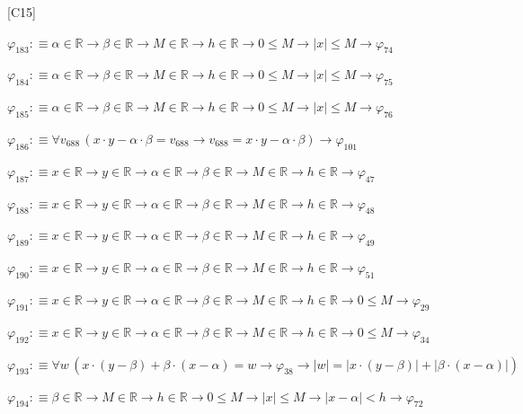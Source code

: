 \begin{fullproof}{[C15]}
\begin{abbrevlist}
\item $\varphi_{183} :\equiv \alpha \in \mathbb{R} \to \beta \in \mathbb{R} \to M \in \mathbb{R} \to h \in \mathbb{R} \to 0 \leq M \to \lvert x \rvert \leq M \to \varphi_{74}$
\item $\varphi_{184} :\equiv \alpha \in \mathbb{R} \to \beta \in \mathbb{R} \to M \in \mathbb{R} \to h \in \mathbb{R} \to 0 \leq M \to \lvert x \rvert \leq M \to \varphi_{75}$
\item $\varphi_{185} :\equiv \alpha \in \mathbb{R} \to \beta \in \mathbb{R} \to M \in \mathbb{R} \to h \in \mathbb{R} \to 0 \leq M \to \lvert x \rvert \leq M \to \varphi_{76}$
\item $\varphi_{186} :\equiv \forall v_{688}\,(x \cdot y - \alpha \cdot \beta = v_{688} \to v_{688} = x \cdot y - \alpha \cdot \beta) \to \varphi_{101}$
\item $\varphi_{187} :\equiv x \in \mathbb{R} \to y \in \mathbb{R} \to \alpha \in \mathbb{R} \to \beta \in \mathbb{R} \to M \in \mathbb{R} \to h \in \mathbb{R} \to \varphi_{47}$
\item $\varphi_{188} :\equiv x \in \mathbb{R} \to y \in \mathbb{R} \to \alpha \in \mathbb{R} \to \beta \in \mathbb{R} \to M \in \mathbb{R} \to h \in \mathbb{R} \to \varphi_{48}$
\item $\varphi_{189} :\equiv x \in \mathbb{R} \to y \in \mathbb{R} \to \alpha \in \mathbb{R} \to \beta \in \mathbb{R} \to M \in \mathbb{R} \to h \in \mathbb{R} \to \varphi_{49}$
\item $\varphi_{190} :\equiv x \in \mathbb{R} \to y \in \mathbb{R} \to \alpha \in \mathbb{R} \to \beta \in \mathbb{R} \to M \in \mathbb{R} \to h \in \mathbb{R} \to \varphi_{51}$
\item $\varphi_{191} :\equiv x \in \mathbb{R} \to y \in \mathbb{R} \to \alpha \in \mathbb{R} \to \beta \in \mathbb{R} \to M \in \mathbb{R} \to h \in \mathbb{R} \to 0 \leq M \to \varphi_{29}$
\item $\varphi_{192} :\equiv x \in \mathbb{R} \to y \in \mathbb{R} \to \alpha \in \mathbb{R} \to \beta \in \mathbb{R} \to M \in \mathbb{R} \to h \in \mathbb{R} \to 0 \leq M \to \varphi_{34}$
\item $\varphi_{193} :\equiv \forall w\,(x \cdot (y - \beta) + \beta \cdot (x - \alpha) = w \to \varphi_{38} \to \lvert w \rvert = \lvert x \cdot (y - \beta) \rvert + \lvert \beta \cdot (x - \alpha) \rvert)$
\item $\varphi_{194} :\equiv \beta \in \mathbb{R} \to M \in \mathbb{R} \to h \in \mathbb{R} \to 0 \leq M \to \lvert x \rvert \leq M \to \lvert x - \alpha \rvert < h \to \varphi_{72}$

\end{abbrevlist}
\end{fullproof}
